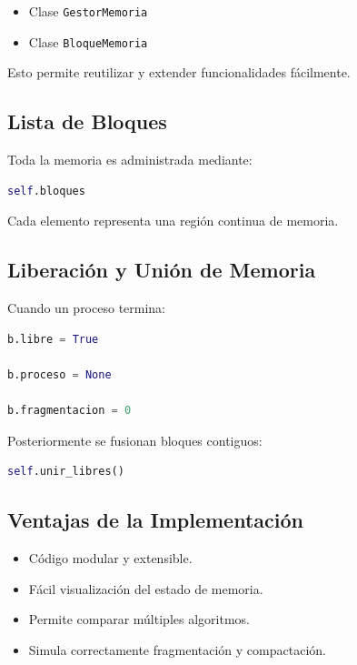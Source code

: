 \begin{itemize}
    \item Clase \texttt{GestorMemoria}
    \item Clase \texttt{BloqueMemoria}
\end{itemize}

Esto permite reutilizar y extender funcionalidades fácilmente.


\subsection{Lista de Bloques}

Toda la memoria es administrada mediante:

\begin{lstlisting}[language=Python]
self.bloques
\end{lstlisting}

Cada elemento representa una región continua de memoria.


\subsection{Liberación y Unión de Memoria}

Cuando un proceso termina:

\begin{lstlisting}[language=Python]
b.libre = True

b.proceso = None

b.fragmentacion = 0
\end{lstlisting}

Posteriormente se fusionan bloques contiguos:

\begin{lstlisting}[language=Python]
self.unir_libres()
\end{lstlisting}


\subsection{Ventajas de la Implementación}

\begin{itemize}
    \item Código modular y extensible.
    
    \item Fácil visualización del estado de memoria.
    
    \item Permite comparar múltiples algoritmos.
    
    \item Simula correctamente fragmentación y compactación.
\end{itemize}

